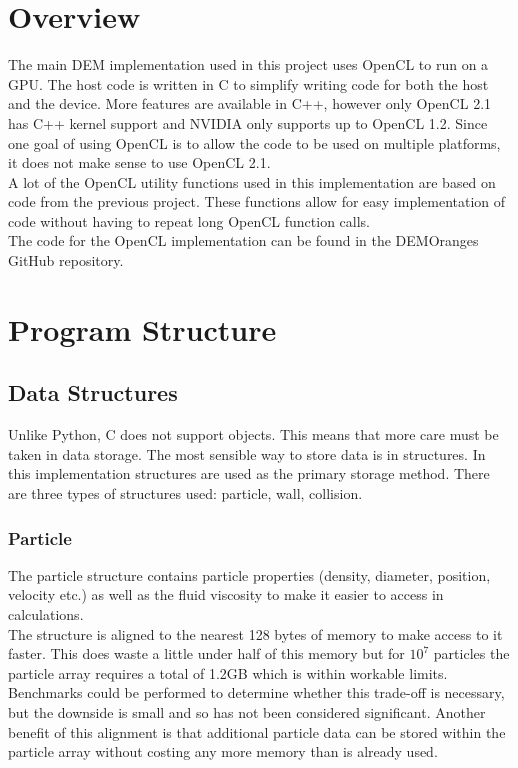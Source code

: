 \documentclass[10pt,a4paper,titlepage]{report}
\begin{document}
\section{Overview}
The main DEM implementation used in this project uses OpenCL to run on a GPU. The host code is written in C to simplify writing code for both the host and the device. More features are available in C++, however only OpenCL 2.1 has C++ kernel support and NVIDIA only supports up to OpenCL 1.2. Since one goal of using OpenCL is to allow the code to be used on multiple platforms, it does not make sense to use OpenCL 2.1.
\\A lot of the OpenCL utility functions used in this implementation are based on code from the previous project\cite{achow}. These functions allow for easy implementation of code without having to repeat long OpenCL function calls.
\\The code for the OpenCL implementation can be found in the DEMOranges GitHub repository\cite{DEMOranges}.
\section{Program Structure}
\subsection{Data Structures}
Unlike Python, C does not support objects. This means that more care must be taken in data storage. The most sensible way to store data is in structures. In this implementation structures are used as the primary storage method. There are three types of structures used: particle, wall, collision.
\subsubsection{Particle}
The particle structure contains particle properties (density, diameter, position, velocity etc.) as well as the fluid viscosity to make it easier to access in calculations.
\\The structure is aligned to the nearest 128 bytes of memory to make access to it faster. This does waste a little under half of this memory but for $10^7$ particles the particle array requires a total of 1.2GB which is within workable limits. Benchmarks could be performed to determine whether this trade-off is necessary, but the downside is small and so has not been considered significant. Another benefit of this alignment is that additional particle data can be stored within the particle array without costing any more memory than is already used.
\end{document}
